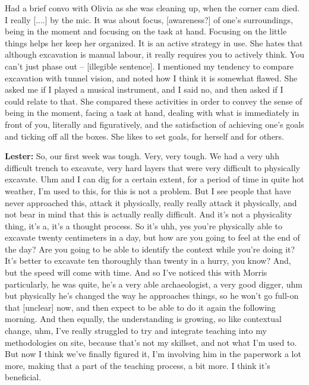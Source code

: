 \begin{arefs}
\item\label{A5}
Had a brief convo with Olivia as she was cleaning up, when the corner cam died. I really [....] by the mic. It was about focus, [awareness?] of one's surroundings, being in the moment and focusing on the task at hand. Focusing on the little things helps her keep her organized. It is an active strategy in use. She hates that although excavation is manual labour, it really requires you to actively think. You can't just phase out -- [illegible sentence]. I mentioned my tendency to compare excavation with tunnel vision, and noted how I think it is somewhat flawed. She asked me if I played a musical instrument, and I said no, and then asked if I could relate to that. She compared these activities in order to convey the sense of being in the moment, facing a task at hand, dealing with what is immediately in front of you, literally and figuratively, and the satisfaction of achieving one's goals and ticking off all the boxes. She likes to set goals, for herself and for others.

\item\label{A6}
\textbf{Lester:} So, our first week was tough. Very, very tough. We had a very uhh difficult trench to excavate, very hard layers that were very difficult to physically excavate. Uhm and I can dig for a certain extent, for a period of time in quite hot weather, I'm used to this, for this is not a problem. But I see people that have never approached this, attack it physically, really really attack it physically, and not bear in mind that this is actually really difficult. And it's not a physicality thing, it's a, it's a thought process. So it's uhh, yes you're physically able to excavate twenty centimeters in a day, but how are you going to feel at the end of the day? Are you going to be able to identify the context while you're doing it? It's better to excavate ten thoroughly than twenty in a hurry, you know? And, but the speed will come with time. And so I've noticed this with Morris particularly, he was quite, he's a very able archaeologist, a very good digger, uhm but physically he's changed the way he approaches things, so he won't go full-on that [unclear] now, and then expect to be able to do it again the following morning. And then equally, the understanding is growing, so like contextual change, uhm, I've really struggled to try and integrate teaching into my methodologies on site, because that's not my skillset, and not what I'm used to. But now I think we've finally figured it, I'm involving him in the paperwork a lot more, making that a part of the teaching process, a bit more. I think it's beneficial.


\end{arefs}
